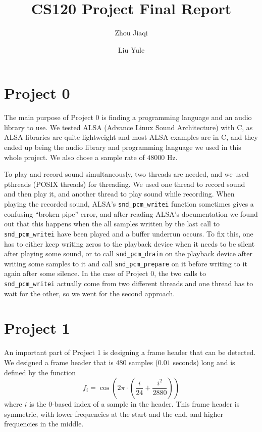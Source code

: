 \documentclass{scrartcl}
\title{CS120 Project Final Report}
\author{Zhou Jiaqi \and Liu Yule}
\date{}
\begin{document}
\maketitle

\section*{Project 0}

The main purpose of Project 0 is finding a programming language and an audio library to use. We tested ALSA (Advance Linux Sound Architecture) with C, as ALSA libraries are quite lightweight and most ALSA examples are in C, and they ended up being the audio library and programming language we used in this whole project. We also chose a sample rate of $48000$ Hz.

To play and record sound simultaneously, two threads are needed, and we used pthreads (POSIX threads) for threading. We used one thread to record sound and then play it, and another thread to play sound while recording. When playing the recorded sound, ALSA's \lstinline{snd_pcm_writei} function sometimes gives a confusing ``broken pipe'' error, and after reading ALSA's documentation we found out that this happens when the all samples written by the last call to \lstinline{snd_pcm_writei} have been played and a buffer underrun occurs. To fix this, one has to either keep writing zeros to the playback device when it needs to be silent after playing some sound, or to call \lstinline{snd_pcm_drain} on the playback device after writing some samples to it and call \lstinline{snd_pcm_prepare} on it before writing to it again after some silence. In the case of Project 0, the two calls to \lstinline{snd_pcm_writei} actually come from two different threads and one thread has to wait for the other, so we went for the second approach.

\section*{Project 1}

An important part of Project 1 is designing a frame header that can be detected. We designed a frame header that is $480$ samples ($0.01$ seconds) long and is defined by the function
\begin{equation*}
  f_i = \cos\left(2\pi \cdot \left(\frac{i}{24} + \frac{i^2}{2880}\right)\right)
\end{equation*}
where $i$ is the $0$-based index of a sample in the header. This frame header is symmetric, with lower frequencies at the start and the end, and higher frequencies in the middle.
\end{document}
